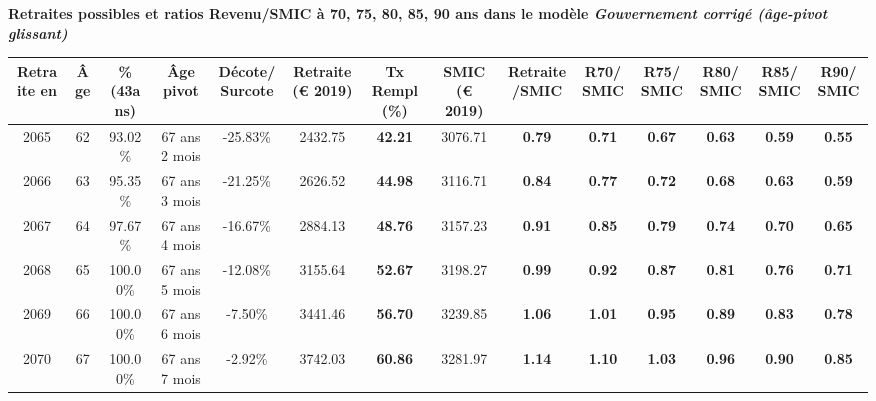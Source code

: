  \vspace{0.1cm} 
{\bf \noindent Retraites possibles et ratios Revenu/SMIC à 70, 75, 80, 85, 90 ans dans le modèle \emph{Gouvernement corrigé (âge-pivot glissant)}}  
 
\begin{adjustbox}{max width=\textwidth} 
\begin{tabular}[htb]{|c|c||c|c|c||c|c||c|c||c|c|c|c|c|} 
\hline 
 Retraite en &  Âge &  \%(43ans) &  Âge pivot &  Décote/Surcote &  Retraite (\euro{} 2019) &  Tx Rempl(\%) &  SMIC (\euro{} 2019) &  Retraite/SMIC &  R70/SMIC &  R75/SMIC &  R80/SMIC &  R85/SMIC &  R90/SMIC \\ 
\hline \hline 
 2065 &  62 &  93.02\% &  67 ans 2 mois &  -25.83\% &  2432.75 &  {\bf 42.21} &  3076.71 &  {\bf {\color{red} 0.79}} &  {\bf {\color{red} 0.71}} &  {\bf {\color{red} 0.67}} &  {\bf {\color{red} 0.63}} &  {\bf {\color{red} 0.59}} &  {\bf {\color{red} 0.55}} \\ 
\hline 
 2066 &  63 &  95.35\% &  67 ans 3 mois &  -21.25\% &  2626.52 &  {\bf 44.98} &  3116.71 &  {\bf {\color{red} 0.84}} &  {\bf {\color{red} 0.77}} &  {\bf {\color{red} 0.72}} &  {\bf {\color{red} 0.68}} &  {\bf {\color{red} 0.63}} &  {\bf {\color{red} 0.59}} \\ 
\hline 
 2067 &  64 &  97.67\% &  67 ans 4 mois &  -16.67\% &  2884.13 &  {\bf 48.76} &  3157.23 &  {\bf {\color{red} 0.91}} &  {\bf {\color{red} 0.85}} &  {\bf {\color{red} 0.79}} &  {\bf {\color{red} 0.74}} &  {\bf {\color{red} 0.70}} &  {\bf {\color{red} 0.65}} \\ 
\hline 
 2068 &  65 &  100.00\% &  67 ans 5 mois &  -12.08\% &  3155.64 &  {\bf 52.67} &  3198.27 &  {\bf {\color{red} 0.99}} &  {\bf {\color{red} 0.92}} &  {\bf {\color{red} 0.87}} &  {\bf {\color{red} 0.81}} &  {\bf {\color{red} 0.76}} &  {\bf {\color{red} 0.71}} \\ 
\hline 
 2069 &  66 &  100.00\% &  67 ans 6 mois &  -7.50\% &  3441.46 &  {\bf 56.70} &  3239.85 &  {\bf 1.06} &  {\bf 1.01} &  {\bf {\color{red} 0.95}} &  {\bf {\color{red} 0.89}} &  {\bf {\color{red} 0.83}} &  {\bf {\color{red} 0.78}} \\ 
\hline 
 2070 &  67 &  100.00\% &  67 ans 7 mois &  -2.92\% &  3742.03 &  {\bf 60.86} &  3281.97 &  {\bf 1.14} &  {\bf 1.10} &  {\bf 1.03} &  {\bf {\color{red} 0.96}} &  {\bf {\color{red} 0.90}} &  {\bf {\color{red} 0.85}} \\ 
\hline 
\hline 
\end{tabular} 
\end{adjustbox} 
 
